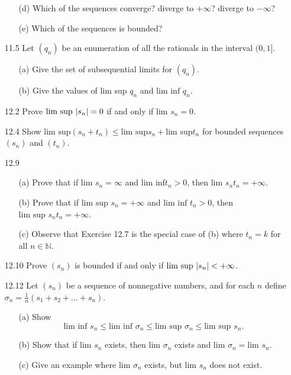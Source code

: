 \documentclass{article}
\begin{document}
\begin{itemize}
\begin{itemize}
              \item [(d)] Which of the sequences converge? diverge to $+\infty$? diverge to $-\infty$?
              \item [(e)] Which of the sequences is bounded?
          \end{itemize}
    \item [11.5] Let $(q_n)$ be an enumeration of all the rationals in the interval $(0,1]$.
          \begin{itemize}
              \item [(a)] Give the set of subsequential limits for $(q_n)$.
              \item [(b)] Give the values of $\text{lim sup }q_n$ and $\text{lim inf }q_n$.
          \end{itemize}
    \item [12.2] Prove $\text{lim sup }\abs{s_n}=0$ if and only if $\text{lim }s_n=0$.
    \item [12.4] Show $\text{lim sup}(s_n+t_n)\leq\text{lim sup} s_n+\text{lim sup} t_n$ for bounded sequences $(s_n)$ and $(t_n)$.
    \item [12.9] \begin{itemize}
              \item [(a)] Prove that if $\text{lim }s_n=\infty$ and $\text{lim inf}t_n>0$, then $\text{lim }s_nt_n=+\infty$.
              \item [(b)] Prove that if $\text{lim sup }s_n=+\infty$ and $\text{lim inf }t_n>0$, then $\text{lim sup }s_nt_n=+\infty$.
              \item [(c)] Observe that Exercise 12.7 is the special case of (b) where $t_n=k$ for all $n\in\mathbb{N}$.
          \end{itemize}
    \item [12.10] Prove $(s_n)$ is bounded if and only if $\text{lim sup }\abs{s_n}<+\infty$.
    \item [12.12] Let $(s_n)$ be a sequence of nonnegative numbers, and for each $n$ define $\sigma_n=\frac{1}{n}(s_1+s_2+\ldots+s_n)$.
          \begin{itemize}
              \item [(a)] Show \[\text{lim inf }s_n\leq\text{lim inf }\sigma_n\leq\text{lim sup }\sigma_n\leq\text{lim sup }s_n.\]
              \item [(b)] Show that if $\text{lim }s_n$ exists, then $\text{lim }\sigma_n$ exists and $\text{lim }\sigma_n=\text{lim }s_n$.
              \item [(c)] Give an example where $\text{lim }\sigma_n$ exists, but $\text{lim }s_n$ does not exist.

\end{itemize}
\end{itemize}
\end{document}
